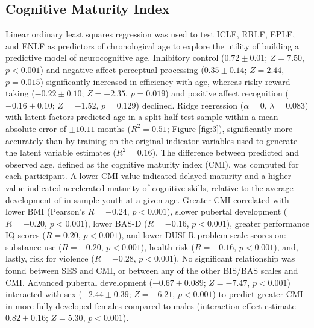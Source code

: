 \documentclass{article}%
\begin{document}
\subsection*{Cognitive Maturity Index} Linear ordinary least squares regression was used to test ICLF, RRLF, EPLF, and ENLF as predictors of chronological age to explore the utility of building a predictive model of neurocognitive age. Inhibitory control ($0.72\pm0.01$; $Z=7.50$, $p<0.001$) and negative affect perceptual processing ($0.35\pm0.14$; $Z=2.44$, $p=0.015$) significantly increased in efficiency with age, whereas risky reward taking ($-0.22\pm0.10$; $Z=-2.35$, $p = 0.019$) and positive affect recognition ($-0.16\pm0.10$; $Z=-1.52$, $p=0.129$) declined. Ridge regression ($\alpha = 0$, $\lambda = 0.083$) with latent factors predicted age in a split-half test sample within a mean absolute error of $\pm 10.11$ months ($R^2=0.51$; Figure \ref{fig:3}), significantly more accurately than by training on the original indicator variables used to generate the latent variable estimates ($R^2=0.16$). The difference between predicted and observed age, defined as the cognitive maturity index (CMI), was computed for each participant. A lower CMI value indicated delayed maturity and a higher value indicated accelerated maturity of cognitive skills, relative to the average development of in-sample youth at a given age. Greater CMI correlated with lower BMI (Pearson's $R=-0.24$, $p<0.001$), slower pubertal development ($R=-0.20$, $p<0.001$), lower BAS-D ($R=-0.16$, $p<0.001$), greater performance IQ scores ($R=0.20$, $p<0.001$), and lower DUSI-R problem scale scores on: substance use ($R=-0.20$, $p<0.001$), health risk ($R=-0.16$, $p<0.001$), and, lastly, risk for violence ($R=-0.28$, $p<0.001$). No significant relationship was found between SES and CMI, or between any of the other BIS/BAS scales and CMI. Advanced pubertal development ($-0.67\pm0.089$; $Z=-7.47$, $p<0.001$) interacted with sex ($-2.44\pm0.39$; $Z=-6.21$, $p<0.001$) to predict greater CMI in more fully developed females compared to males (interaction effect estimate $0.82\pm0.16$; $Z=5.30$, $p<0.001$).
%
\end{document}
